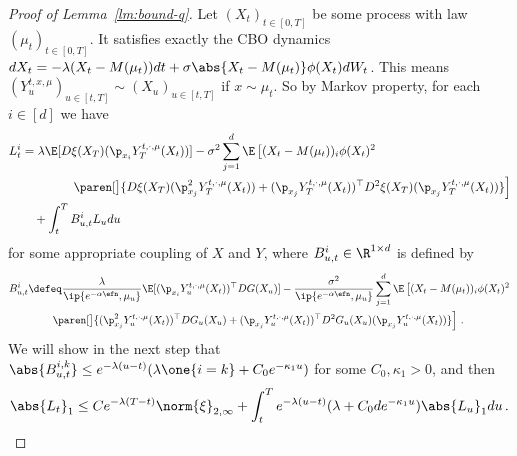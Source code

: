 \documentclass{amsart}
\begin{document}
\begin{proof}[Proof of Lemma~\ref{lm:bound-q}]
	Let $(X_t)_{t \in [0,T]}$ be some process with law $(\mu_t)_{t \in [0,T]}$. 
	It satisfies exactly the CBO dynamics $dX_t = -\lambda (X_t - M(\mu_t)) dt + \sigma \abs{X_t - M(\mu_t)} \phi(X_t) dW_t$.
	This means $(Y^{t,x,\mu}_u)_{u \in [t,T]} \sim (X_u)_{u \in [t,T]}$ if $x \sim \mu_t$. 
	So by Markov property, for each $i \in [d]$ we have 
	\begin{align*}
		L^i_t & = \lambda \E [D\xi(X_T) (\p_{x_i} Y^{t,\cdot,\mu}_T (X_t))] - \sigma^2 \sum_{j=1}^d \E \left[(X_t - M(\mu_t))_i \phi(X_t)^2 \right. \\
		& \qquad \qquad  \left. \paren[\big]{ D\xi(X_T) (\p_{x_j}^2 Y^{t,\cdot,\mu}_T (X_t)) + (\p_{x_j} Y^{t,\cdot,\mu}_T (X_t))^\top D^2 \xi(X_T) (\p_{x_j} Y^{t,\cdot,\mu}_T(X_t)) } \right] \\
		& \quad + \int_t^T B^i_{u,t} L_u  du
	\end{align*}
	for some appropriate coupling of $X$ and $Y$, where $B^i_{u,t} \in \R^{1 \times d}$ is defined by 
	\begin{align*}
		B^i_{u,t} & \defeq \frac{\lambda}{\ip{e^{-\alpha\efn},\mu_u}} \E [(\p_{x_i} Y^{t,\cdot,\mu}_u (X_t))^\top DG(X_u)] - \frac{\sigma^2}{\ip{e^{-\alpha\efn},\mu_u}} \sum_{j=1}^d \E \left[ (X_t - M(\mu_t))_i \phi(X_t)^2 \right. \\
		& \qquad \left. \paren[\big]{ (\p_{x_j}^2 Y^{t,\cdot,\mu}_u (X_t))^\top DG_u(X_u) + (\p_{x_j} Y^{t,\cdot,\mu}_u (X_t))^\top D^2 G_u(X_u) (\p_{x_j} Y^{t,\cdot,\mu}_u(X_t)) } \right] \,.
	\end{align*}
	We will show in the next step that $\abs{B^{i,k}_{u,t}} \le e^{-\lambda (u-t)}(\lambda \one{i=k} + C_0 e^{-\kappa_1 u})$ for some $C_0, \kappa_1 > 0$, and then 
	\begin{equation*}
		\abs{L_t}_1 \le C  e^{-\lambda (T-t)} \norm{\xi}_{2,\infty} + \int_t^T e^{-\lambda(u-t)} (\lambda + C_0 d e^{-\kappa_1 u}) \abs{L_u}_1 du \,.
	\end{equation*}


\end{proof}
\end{document}
